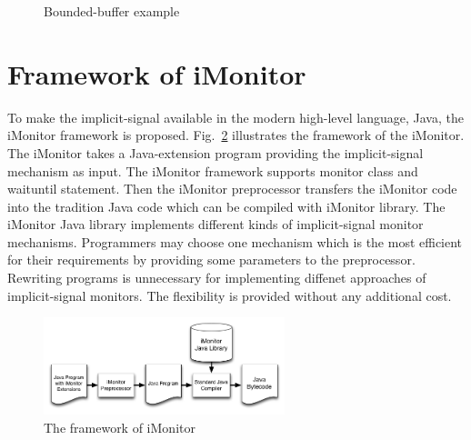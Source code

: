 \documentclass[preprint]{sigplanconf}
\begin{document}
\begin{figure}
  \centering
  \caption{Bounded-buffer example}
  \label{fig:bounded_buffer_example}
\end{figure}

\section{Framework of iMonitor} \label{sec:fw}
To make the implicit-signal available in the modern high-level language, Java, 
the iMonitor framework is proposed. Fig.~\ref{fig:framework} illustrates the 
framework of the iMonitor. The iMonitor takes a Java-extension program providing
the implicit-signal mechanism as input. The iMonitor framework supports monitor
class and waituntil statement. Then the iMonitor preprocessor transfers
the iMonitor code into the tradition Java code which can be compiled with 
iMonitor library. The iMonitor Java library implements different kinds of 
implicit-signal monitor mechanisms. Programmers may choose one mechanism 
which is the most efficient for their requirements by providing some 
parameters to the preprocessor. Rewriting programs is unnecessary for
implementing diffenet approaches of implicit-signal monitors. The flexibility 
is provided without any additional cost. 

\begin{figure}[h!]
  \centering
  \includegraphics[width=70mm]{fig/flow.png}
  \caption{The framework of iMonitor}
  \label{fig:framework}
\end{figure}
\end{document}
